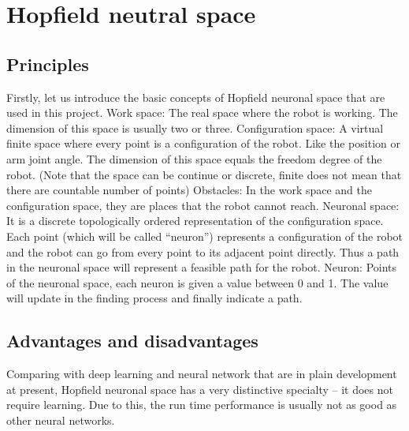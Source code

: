 \chapter{Hopfield neutral space}
\label{cha:hopfield}

\section{Principles}
\label{sec:hopfield_Principles}
Firstly, let us introduce the basic concepts of Hopfield neuronal space that are used in this project.
Work space: The real space where the robot is working. The dimension of this space is usually two or three.
Configuration space: A virtual finite space where every point is a configuration of the robot. Like the position or arm joint angle. The dimension of this space equals the freedom degree of the robot. (Note that the space can be continue or discrete, finite does not mean that there are countable number of points)
Obstacles: In the work space and the configuration space, they are places that the robot cannot reach.
Neuronal space: It is a discrete topologically ordered representation of the configuration space. Each point (which will be called “neuron”) represents a configuration of the robot and the robot can go from every point to its adjacent point directly. Thus a path in the neuronal space will represent a feasible path for the robot.
Neuron: Points of the neuronal space, each neuron is given a value between 0 and 1. The value will update in the finding process and finally indicate a path.

\section{Advantages and disadvantages}
\label{sec:hopfield_advanddisadv}
Comparing with deep learning and neural network that are in plain development at present,
Hopfield neuronal space has a very distinctive specialty – it does not require learning.
Due to this, the run time performance is usually not as good as other neural networks.


